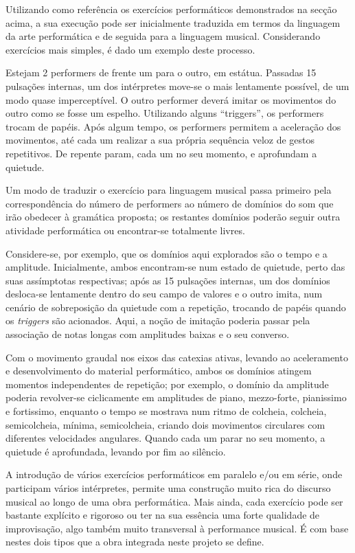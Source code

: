 \documentclass[../main.tex]{subfiles}
\begin{document}
Utilizando como referência os exercícios performáticos demonstrados na secção acima, a sua execução pode ser inicialmente traduzida em termos da linguagem da arte performática e de seguida para a linguagem musical. Considerando exercícios mais simples, é dado um exemplo deste processo.

\begin{performex}
    Estejam 2 performers de frente um para o outro, em estátua. Passadas 15 pulsações internas, um dos intérpretes move-se o mais lentamente possível, de um modo quase imperceptível. O outro performer deverá imitar os movimentos do outro como se fosse um espelho. Utilizando alguns \enquote{triggers}, os performers trocam de papéis. Após algum tempo, os performers permitem a aceleração dos movimentos, até cada um realizar a sua própria sequência veloz de gestos repetitivos. De repente param, cada um no seu momento, e aprofundam a quietude.
\end{performex}

Um modo de traduzir o exercício para linguagem musical passa primeiro pela correspondência do número de performers ao número de domínios do som que irão obedecer à gramática proposta; os restantes domínios poderão seguir outra atividade performática ou encontrar-se totalmente livres.

Considere-se, por exemplo, que os domínios aqui explorados são o tempo e a amplitude. Inicialmente, ambos encontram-se num estado de quietude, perto das suas assímptotas respectivas; após as 15 pulsações internas, um dos domínios desloca-se lentamente dentro do seu campo de valores e o outro imita, num cenário de sobreposição da quietude com a repetição, trocando de papéis quando os \textsl{triggers} são acionados. Aqui, a noção de imitação poderia passar pela associação de notas longas com amplitudes baixas e o seu converso.

Com o movimento graudal nos eixos das catexias ativas, levando ao aceleramento e desenvolvimento do material performático, ambos os domínios atingem momentos independentes de repetição; por exemplo, o domínio da amplitude poderia revolver-se ciclicamente em amplitudes de piano, mezzo-forte, pianissimo e fortissimo, enquanto o tempo se mostrava num ritmo de colcheia, colcheia, semicolcheia, mínima, semicolcheia, criando dois movimentos circulares com diferentes velocidades angulares. Quando cada um parar no seu momento, a quietude é aprofundada, levando por fim ao silêncio.

A introdução de vários exercícios performáticos em paralelo e/ou em série, onde participam vários intérpretes, permite uma construção muito rica do discurso musical ao longo de uma obra performática. Mais ainda, cada exercício pode ser bastante explícito e rigoroso ou ter na sua essência uma forte qualidade de improvisação, algo também muito transversal à performance musical. É com base nestes dois tipos que a obra integrada neste projeto se define.
\end{document}
